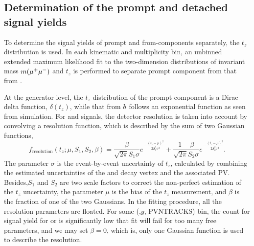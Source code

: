 \subsection{Determination of the prompt and detached signal yields}
\label{sec:MassTzFit}
To determine the signal yields of prompt and from-\bquark components separately, the $t_z$ distribution is used.
In each kinematic and multiplicity bin, an unbinned extended maximum likelihood fit to the two-dimension distributions of invariant mass $m({\mu^+\mu^-})$ and $t_z$ is performed to separate prompt component from that from \bquark.

At the generator level, the $t_z$ distribution of the prompt component is a Dirac delta function, $\delta(t_z)$, while that from ${b}$ follows an exponential function as seen from simulation. 
For \jpsi and \psitwos signals, the detector resolution is taken into account by convolving a resolution function, which is described by the sum of two Gaussian functions,
\begin{equation}
f_\mathrm{resolution}(t_z;\mu,S_1,S_2,\beta) = \frac{\beta}{\sqrt{2\pi}S_1\sigma} e^{-\frac{(t_z-\mu)^2}{2S_1^2\sigma^2}}
+\frac{1-\beta}{\sqrt{2\pi}S_2\sigma} e^{-\frac{(t_z-\mu)^2}{2S_2^2\sigma^2}}.
\end{equation}
The parameter $\sigma$ is the event-by-event uncertainty of $t_z$, calculated by combining the estimated uncertainties of the \jpsi and \psitwos decay vertex and the associated PV.
Besides,$S_1$ and $S_2$ are two scale factors to correct the non-perfect estimation of the $t_z$ uncertainty, the parameter $\mu$ is the bias of the $t_z$ measurement, and $\beta$ is the fraction of one of the two Gaussians. 
In the fitting procedure, all the resolution parameters are floated.
For some (\pt,$y$, PVNTRACKS) bin, the count for signal yield for \psitwos or \jpsi is significantly low that fit will fail for too many free parameters, and we may set $\beta=0$, which is, only one Gaussian function is used to describe the resolution. 

